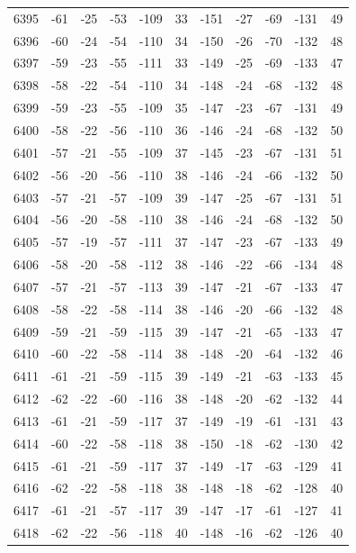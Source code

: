\begin{table}[H]
\begin{tabular}{lllllllllll}
6395 & -61 & -25 & -53 & -109 & 33 & -151 & -27 & -69 & -131 & 49 \\
6396 & -60 & -24 & -54 & -110 & 34 & -150 & -26 & -70 & -132 & 48 \\
6397 & -59 & -23 & -55 & -111 & 33 & -149 & -25 & -69 & -133 & 47 \\
6398 & -58 & -22 & -54 & -110 & 34 & -148 & -24 & -68 & -132 & 48 \\
6399 & -59 & -23 & -55 & -109 & 35 & -147 & -23 & -67 & -131 & 49 \\
6400 & -58 & -22 & -56 & -110 & 36 & -146 & -24 & -68 & -132 & 50 \\
6401 & -57 & -21 & -55 & -109 & 37 & -145 & -23 & -67 & -131 & 51 \\
6402 & -56 & -20 & -56 & -110 & 38 & -146 & -24 & -66 & -132 & 50 \\
6403 & -57 & -21 & -57 & -109 & 39 & -147 & -25 & -67 & -131 & 51 \\
6404 & -56 & -20 & -58 & -110 & 38 & -146 & -24 & -68 & -132 & 50 \\
6405 & -57 & -19 & -57 & -111 & 37 & -147 & -23 & -67 & -133 & 49 \\
6406 & -58 & -20 & -58 & -112 & 38 & -146 & -22 & -66 & -134 & 48 \\
6407 & -57 & -21 & -57 & -113 & 39 & -147 & -21 & -67 & -133 & 47 \\
6408 & -58 & -22 & -58 & -114 & 38 & -146 & -20 & -66 & -132 & 48 \\
6409 & -59 & -21 & -59 & -115 & 39 & -147 & -21 & -65 & -133 & 47 \\
6410 & -60 & -22 & -58 & -114 & 38 & -148 & -20 & -64 & -132 & 46 \\
6411 & -61 & -21 & -59 & -115 & 39 & -149 & -21 & -63 & -133 & 45 \\
6412 & -62 & -22 & -60 & -116 & 38 & -148 & -20 & -62 & -132 & 44 \\
6413 & -61 & -21 & -59 & -117 & 37 & -149 & -19 & -61 & -131 & 43 \\
6414 & -60 & -22 & -58 & -118 & 38 & -150 & -18 & -62 & -130 & 42 \\
6415 & -61 & -21 & -59 & -117 & 37 & -149 & -17 & -63 & -129 & 41 \\
6416 & -62 & -22 & -58 & -118 & 38 & -148 & -18 & -62 & -128 & 40 \\
6417 & -61 & -21 & -57 & -117 & 39 & -147 & -17 & -61 & -127 & 41 \\
6418 & -62 & -22 & -56 & -118 & 40 & -148 & -16 & -62 & -126 & 40 \\

\end{tabular}
\end{table}
